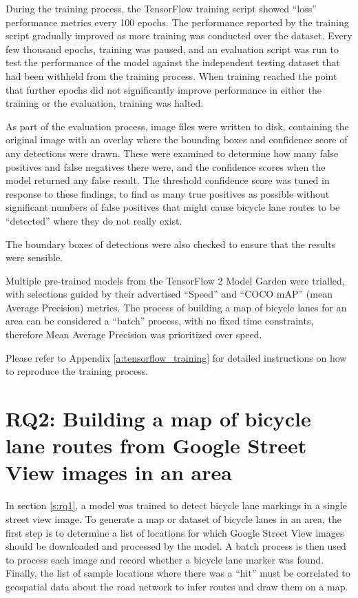 \documentclass[11pt,twoside]{report}
\begin{document}
During the training process, the TensorFlow training script showed ``loss'' performance metrics every 100 epochs.  The performance reported by the training script gradually improved as more training was conducted over the dataset.  Every few thousand epochs, training was paused, and an evaluation script was run to test the performance of the model against the independent testing dataset that had been withheld from the training process.  When training reached the point that further epochs did not significantly improve performance in either the training or the evaluation, training was halted.

As part of the evaluation process, image files were written to disk, containing the original image with an overlay where the bounding boxes and confidence score of any detections were drawn.  These were examined to determine how many false positives and false negatives there were, and the confidence scores when the model returned any false result.  The threshold confidence score was tuned in response to these findings, to find as many true positives as possible without significant numbers of false positives that might cause bicycle lane routes to be ``detected'' where they do not really exist.

The boundary boxes of detections were also checked to ensure that the results were sensible.

Multiple pre-trained models from the TensorFlow 2 Model Garden were trialled, with selections guided by their advertised ``Speed'' and ``COCO mAP'' (mean Average Precision) metrics.  The process of building a map of bicycle lanes for an area can be considered a ``batch'' process, with no fixed time constraints, therefore Mean Average Precision was prioritized over speed.

Please refer to Appendix \ref{a:tensorflow_training} for detailed instructions on how to reproduce the training process.

\section{RQ2: Building a map of bicycle lane routes from Google Street View images in an area}
\label{s:rq2}

In section \ref{s:rq1}, a model was trained to detect bicycle lane markings in a single street view image.  To generate a map or dataset of bicycle lanes in an area, the first step is to determine a list of locations for which Google Street View images should be downloaded and processed by the model.  A batch process is then used to process each image and record whether a bicycle lane marker was found.  Finally, the list of sample locations where there was a ``hit'' must be correlated to geospatial data about the road network to infer  routes and draw them on a map.
\end{document}
